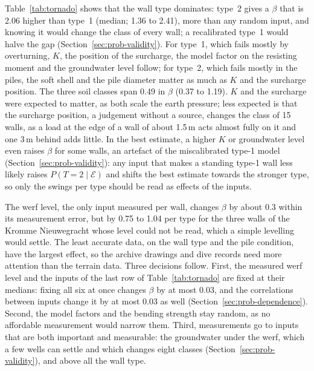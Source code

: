 Table~\ref{tab:tornado} shows that the wall type dominates: type~2 gives a
$\beta$ that is 2.06 higher than type~1 (median; 1.36 to 2.41), more than any
random input, and knowing it would change the class of every wall; a
recalibrated type~1 would halve the gap (Section~\ref{sec:prob-validity}). For
type~1, which fails mostly by overturning, $K$, the position of the surcharge,
the model factor on the resisting moment and the groundwater level follow; for
type~2, which fails mostly in the piles, the soft shell and the pile diameter
matter as much as $K$ and the surcharge position. The three soil classes span
0.49 in $\beta$ (0.37 to 1.19). $K$ and the surcharge were expected to matter,
as both scale the earth pressure; less expected is that the surcharge
position, a judgement without a source, changes the class of 15 walls, as a
load at the edge of a wall of about 1.5\,m acts almost fully on it and one
3\,m behind adds little. In the best estimate, a higher $K$ or groundwater level
even raises $\beta$ for some walls, an artefact of the miscalibrated type-1
model (Section~\ref{sec:prob-validity}): any input that makes a standing type-1
wall less likely raises $P(T{=}2 \mid \mathcal{E})$ and shifts the best
estimate towards the stronger type, so only the swings per type should be read
as effects of the inputs.

The werf level, the only input measured per wall, changes $\beta$ by about 0.3
within its measurement error, but by 0.75 to 1.04 per type for the three walls
of the Kromme Nieuwegracht whose level could not be read, which a simple
levelling would settle. The least accurate data, on the wall type and the pile condition, have
the largest effect, so the archive drawings and dive records need more
attention than the terrain data. Three decisions follow. First, the measured werf level and the inputs of the last row of Table~\ref{tab:tornado} are fixed at their medians: fixing all six at once changes $\beta$ by at most 0.03, and
the correlations between inputs change it by at most 0.03 as well
(Section~\ref{sec:prob-dependence}).
Second, the model factors and the bending strength stay random, as no affordable measurement would narrow them. Third, measurements go to inputs that are both important and measurable: the groundwater under the werf, which a few wells can settle and which changes eight classes (Section~\ref{sec:prob-validity}), and above all the wall type.

